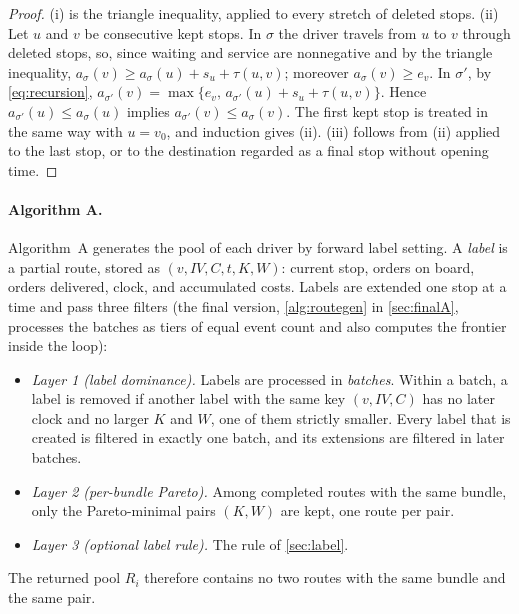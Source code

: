 \documentclass[11pt]{article}
\theoremstyle{definition}
\theoremstyle{remark}
\begin{document}
\begin{proof}
(i) is the triangle inequality, applied to every stretch of deleted stops.
(ii) Let $u$ and $v$ be consecutive kept stops. In $\sigma$ the driver travels
from $u$ to $v$ through deleted stops, so, since waiting and service are
nonnegative and by the triangle inequality,
$a_\sigma(v)\ge a_\sigma(u)+s_u+\tau(u,v)$; moreover $a_\sigma(v)\ge e_v$. In
$\sigma'$, by \eqref{eq:recursion},
$a_{\sigma'}(v)=\max\{e_v,\,a_{\sigma'}(u)+s_u+\tau(u,v)\}$. Hence
$a_{\sigma'}(u)\le a_\sigma(u)$ implies $a_{\sigma'}(v)\le a_\sigma(v)$. The
first kept stop is treated in the same way with $u=v_0$, and induction gives
(ii). (iii) follows from (ii) applied to the last stop, or to the destination
regarded as a final stop without opening time.
\end{proof}

\paragraph{Algorithm A.}
Algorithm~A generates the pool of each driver by forward label setting. A
\emph{label} is a partial route, stored as $(v,IV,C,t,K,W)$: current stop,
orders on board, orders delivered, clock, and accumulated costs. Labels are
extended one stop at a time and pass three filters (the final version,
\cref{alg:routegen} in \cref{sec:finalA}, processes the batches as tiers of
equal event count and also computes the frontier inside the loop):
\begin{itemize}[leftmargin=1.4em, itemsep=1pt]
\item \emph{Layer 1 (label dominance).} Labels are processed in
\emph{batches}. Within a batch, a label is removed if another label with the
same key $(v,IV,C)$ has no later clock and no larger $K$ and $W$, one of them
strictly smaller. Every label that is created is filtered in exactly one batch,
and its extensions are filtered in later batches.
\item \emph{Layer 2 (per-bundle Pareto).} Among completed routes with the same
bundle, only the Pareto-minimal pairs $(K,W)$ are kept, one route per pair.
\item \emph{Layer 3 (optional label rule).} The rule of \cref{sec:label}.
\end{itemize}
The returned pool $R_i$ therefore contains no two routes with the same bundle
and the same pair.
\end{document}
